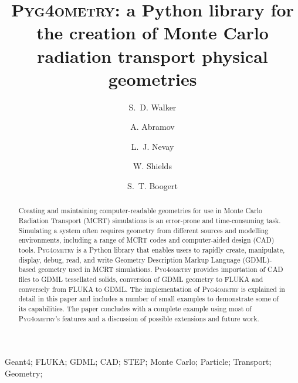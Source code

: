 \documentclass[preprint,12pt]{elsarticle}
\newcommand{\PYGEOMETRY}{\textsc{Pyg4ometry}}
\newcommand{\PYGEOMETRYPOS}{\textsc{Pyg4ometry's}} %
\begin{document}
\begin{frontmatter}



\title{\PYGEOMETRY{}: a Python library for the creation of Monte Carlo radiation transport physical geometries}


\author[a]{S.~D. Walker}
\author[a]{A. Abramov}
\author[a]{L.~J. Nevay}
\author[a]{W. Shields}
\author[a]{S.~T. Boogert}

\address[a]{John Adams Institute at Royal Holloway, Department of Physics, Royal Holloway, Egham, TW20 0EX, Surrey, UK}

\begin{abstract}
Creating and maintaining computer-readable geometries for use in Monte Carlo Radiation Transport (MCRT) simulations is an
error-prone and time-consuming task. Simulating a system often requires geometry from different sources and modelling
environments, including a range of MCRT codes and computer-aided design (CAD) tools. \PYGEOMETRY{} is a Python library
that enables users to rapidly create, manipulate, display, debug, read, and write Geometry Description Markup Language (GDML)-based
geometry used in MCRT simulations. \PYGEOMETRY{} provides importation of CAD files to GDML tessellated solids, conversion of GDML geometry
to FLUKA and conversely from FLUKA to GDML. The implementation of \PYGEOMETRY{} is explained in detail in this paper and includes a number of small
examples to demonstrate some of its capabilities. The paper concludes with a complete example using most of \PYGEOMETRYPOS{} features and a discussion of possible
extensions and future work.
\end{abstract}

\begin{keyword}
Geant4; FLUKA; GDML; CAD; STEP; Monte Carlo; Particle; Transport; Geometry;

\end{keyword}

\end{frontmatter}
\end{document}
